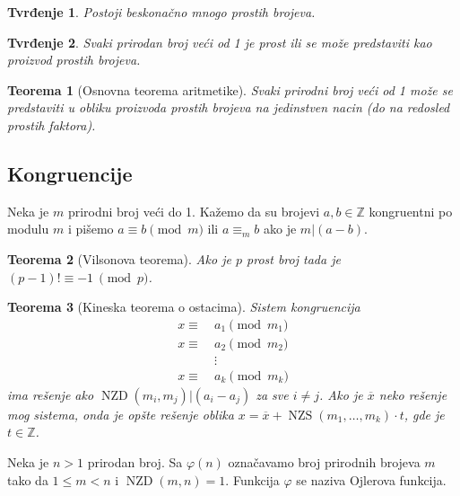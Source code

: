 \documentclass[12p,14paper]{article}
\DeclareMathOperator{\nzd}{NZD}
\DeclareMathOperator{\nzs}{NZS}
\newtheorem*{theorem}{Teorema}
\newtheorem*{prop}{Tvrđenje}
\begin{document}
\begin{multicols}{2}
    \begin{prop}
        Postoji beskonačno mnogo prostih brojeva.
    \end{prop}

    \begin{prop}
        Svaki prirodan broj veći od 1 je prost ili se može predstaviti kao 
        proizvod prostih brojeva.
    \end{prop}

    \begin{theorem}[Osnovna teorema aritmetike]
        Svaki prirodni broj veći od 1 može se predstaviti u obliku proizvoda 
        prostih brojeva na jedinstven nacin (do na redosled prostih faktora).
    \end{theorem}

\subsection{Kongruencije}

    Neka je $m$ prirodni broj veći do 1. Kažemo da su brojevi 
    $a, b \in \mathbb{Z}$ kongruentni po modulu $m$ i pišemo 
    $a \equiv b \pmod m$ ili $a \equiv_m b$ ako je $m | (a - b)$.

    \begin{theorem}[Vilsonova teorema]
        Ako je $p$ prost broj tada je $(p - 1)! \equiv -1\ \pmod p$.
    \end{theorem}

    \begin{theorem}[Kineska teorema o ostacima]
        Sistem kongruencija
        \begin{align*}
            x \equiv\ & a_1 \pmod m_1 \\
            x \equiv\ & a_2 \pmod m_2 \\
            & \vdots \\
            x \equiv\ & a_k \pmod m_k 
        \end{align*}
        ima rešenje ako $\nzd(m_i, m_j) | (a_i - a_j)$ za sve $i \neq j$. Ako
        je $\overline{x}$ neko rešenje mog sistema, onda je opšte rešenje 
        oblika $x = \overline{x} + \nzs(m_1, \ldots, m_k) \cdot t$, gde je 
        $t \in \mathbb{Z}$.
    \end{theorem}

    Neka je $n > 1$ prirodan broj. Sa $\varphi (n)$ označavamo broj prirodnih 
    brojeva $m$ tako da $1 \leq m < n$ i $\nzd(m, n) = 1$. Funkcija $\varphi$ 
    se naziva Ojlerova funkcija.


\end{multicols}
\end{document}
